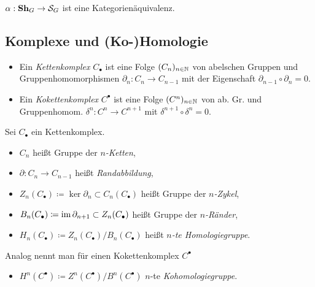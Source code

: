 \documentclass{cheat-sheet}
\newcommand{\CC}[1]{{#1}_{\bullet}} %
\newcommand{\CCC}[1]{{#1}^{\bullet}} %
\begin{document}
\begin{prop}
  $\alpha : \mathbf{Sh}_G \to \mathcal{S}_G$ ist eine Kategorienäquivalenz.
\end{prop}



\begin{samepage}
  \section{Komplexe und (Ko-)Homologie}
\end{samepage}


\begin{defn}
  \begin{itemize}
    \item Ein \emph{Kettenkomplex} $\CC{C}$ ist eine Folge $(C_n)_{n \in \mathbb{N}}$ von abelschen Gruppen und Gruppenhomomorphismen $\partial_n : C_n \to C_{n-1}$ mit der Eigenschaft $\partial_{n-1} \circ \partial_n = 0$.
    \item Ein \emph{Kokettenkomplex} $\CCC{C}$ ist eine Folge $(C^n)_{n \in \mathbb{N}}$ von ab. Gr. und Gruppenhomom. $\delta^n : C^n \to C^{n+1}$ mit $\delta^{n+1} \circ \delta^n = 0$.
  \end{itemize}
\end{defn}

\begin{defn}
  Sei $\CC{C}$ ein Kettenkomplex.
  \begin{itemize}
    \item $C_n$ heißt Gruppe der \emph{$n$-Ketten},
    \item $\partial : C_n \to C_{n-1}$ heißt \emph{Randabbildung},
    \item $Z_n(\CC{C}) \coloneqq \ker \partial_n \subset C_n(\CC{C})$ heißt Gruppe der \emph{$n$-Zykel},
    \item $B_n(\CC{C}) \coloneqq \im \partial_{n+1} \subset Z_n(\CC{C})$ heißt Gruppe der \emph{$n$-Ränder},
    \item $H_n(\CC{C}) \coloneqq Z_n(\CC{C}) / B_n(\CC{C})$ heißt \emph{$n$-te Homologiegruppe}.
  \end{itemize}
  Analog nennt man für einen Kokettenkomplex $\CCC{C}$
  \begin{itemize}
    \item $H^n(\CCC{C}) \coloneqq Z^n(\CCC{C}) / B^n(\CCC{C})$ $n$-te \emph{Kohomologiegruppe}.
  \end{itemize}
\end{defn}
\end{document}
